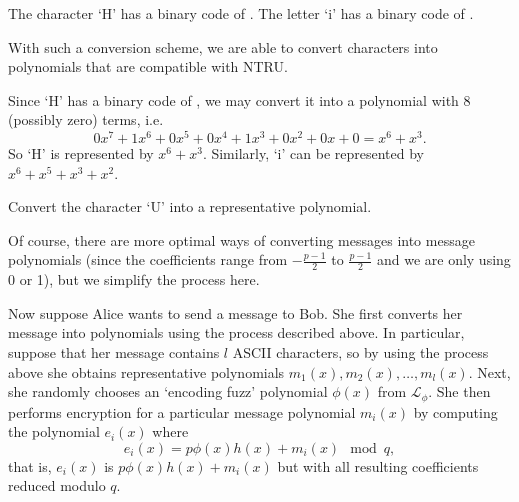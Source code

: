 \begin{example}
    The character `H' has a binary code of . The letter `i' has a binary code of .
\end{example}

With such a conversion scheme, we are able to convert characters into polynomials that are compatible with NTRU.

\begin{example}
    Since `H' has a binary code of , we may convert it into a polynomial with 8 (possibly zero) terms, i.e.
    \[
        0x^7 + 1x^6 + 0x^5 + 0x^4 + 1x^3 + 0x^2 + 0x + 0 = x^6 + x^3.
    \]
    So `H' is represented by $x^6 + x^3$. Similarly, `i' can be represented by $x^6 + x^5 + x^3 + x^2$.
\end{example}

\begin{exercise}
    Convert the character `U' into a representative polynomial.
\end{exercise}

Of course, there are more optimal ways of converting messages into message polynomials (since the coefficients range from $-\frac{p-1}2$ to $\frac{p-1}2$ and we are only using 0 or 1), but we simplify the process here.

Now suppose Alice wants to send a message to Bob. She first converts her message into polynomials using the process described above. In particular, suppose that her message contains $l$ ASCII characters, so by using the process above she obtains representative polynomials $m_1(x), m_2(x), \dots, m_l(x)$. Next, she randomly chooses an `encoding fuzz' polynomial $\phi(x)$ from $\mathcal{L}_\phi$. She then performs encryption for a particular message polynomial $m_i(x)$ by computing the polynomial $e_i(x)$ where
\[
    e_i(x) = p\phi(x)h(x) + m_i(x) \mod q,
\]
that is, $e_i(x)$ is $p\phi(x)h(x) + m_i(x)$ but with all resulting coefficients reduced modulo $q$.

